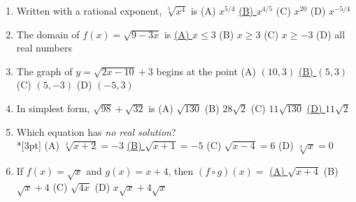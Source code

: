 \documentclass[10pt]{article}
\begin{document}
\begin{enumerate}[leftmargin=1.9em, itemsep=9pt]
  \item Written with a rational exponent, $\sqrt[5]{x^4}$ is\rlap{\hspace{4pt}\choicebox{\gradedblank[id=q9, type=choice, points=2, answer={B}]{0.3in}{10pt}}}
    \hfill (A) $x^{5/4}$ \quad \textcolor{keyred}{\underline{(B) $x^{4/5}$}} \quad (C) $x^{20}$ \quad (D) $x^{-5/4}$
  \item The domain of $f(x)=\sqrt{9-3x}$ is\rlap{\hspace{4pt}\choicebox{\gradedblank[id=q10, type=choice, points=2, answer={A}]{0.3in}{10pt}}}
    \hfill \textcolor{keyred}{\underline{(A) $x\le 3$}} \quad (B) $x\ge 3$ \quad (C) $x\ge -3$ \quad (D) all real numbers
  \item The graph of $y=\sqrt{2x-10}+3$ begins at the point\rlap{\hspace{4pt}\choicebox{\gradedblank[id=q11, type=choice, points=2, answer={B}]{0.3in}{10pt}}}
    \hfill (A) $(10,3)$ \quad \textcolor{keyred}{\underline{(B) $(5,3)$}} \quad (C) $(5,-3)$ \quad (D) $(-5,3)$
  \item In simplest form, $\sqrt{98}+\sqrt{32}$ is\rlap{\hspace{4pt}\choicebox{\gradedblank[id=q12, type=choice, points=2, answer={D}]{0.3in}{10pt}}}
    \hfill (A) $\sqrt{130}$ \quad (B) $28\sqrt2$ \quad (C) $11\sqrt{130}$ \quad \textcolor{keyred}{\underline{(D) $11\sqrt2$}}
  \item {}Which equation has \emph{no real solution}?
    \\*[3pt]\hspace*{1.2em} (A) $\sqrt[3]{x+2}=-3$
    \hspace{1.0cm} \textcolor{keyred}{\underline{(B) $\sqrt{x+1}=-5$}}
    \hspace{1.0cm} (C) $\sqrt{x-4}=6$
    \hspace{1.0cm} (D) $\sqrt[3]{x}=0$
  \item If $f(x)=\sqrt{x}$ and $g(x)=x+4$, then $(f\circ g)(x)=$\rlap{\hspace{3pt}\choicebox{\gradedblank[id=q14, type=choice, points=2, answer={A}]{0.26in}{10pt}}}
    \hfill \textcolor{keyred}{\underline{(A) $\sqrt{x+4}$}} \quad (B) $\sqrt{x}+4$ \quad (C) $\sqrt{4x}$ \quad (D) $x\sqrt{x}+4\sqrt{x}$
\end{enumerate}
\end{document}
